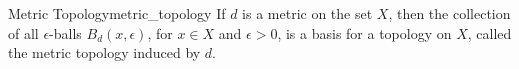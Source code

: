 
\begin{definition}{Metric Topology}{metric_topology}
If $d$ is a metric on the set $X$, then the collection of all $\epsilon$-balls $B_{d}(x, \epsilon)$, for $x \in X$ and $\epsilon>0$, is a basis for a topology on $X$, called the metric topology induced by $d$.
\end{definition}
